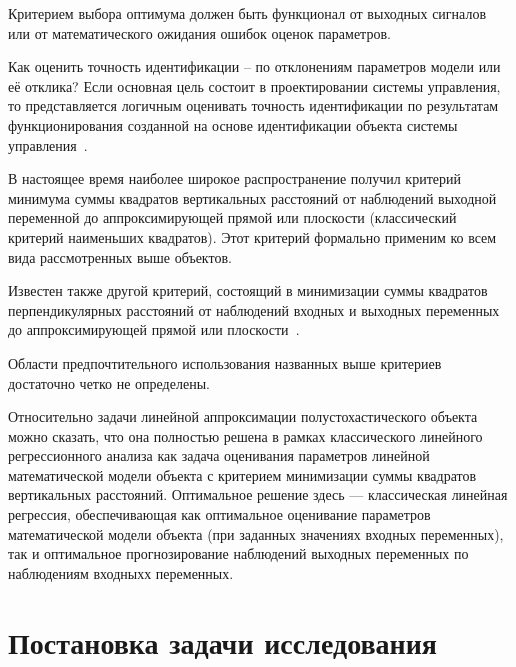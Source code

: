 Критерием выбора оптимума должен быть функционал от выходных
сигналов или от математического ожидания ошибок оценок параметров.

Как оценить точность идентификации -- по отклонениям параметров
модели или её отклика? Если основная цель состоит в
проектировании системы управления, то представляется логичным
оценивать точность идентификации по результатам функционирования
созданной на основе идентификации объекта системы управления~\cite{eikhoff_1975}.

В настоящее время наиболее широкое распространение получил критерий
минимума суммы квадратов вертикальных расстояний от наблюдений выходной переменной
до аппроксимирующей прямой или плоскости (классический критерий наименьших квадратов).
Этот критерий формально применим ко всем вида рассмотренных выше объектов.

Известен также другой критерий, состоящий в минимизации суммы квадратов
перпендикулярных расстояний от наблюдений входных и выходных переменных до
аппроксимирующей прямой или плоскости~\cite{pearson_1901, mukha_2016}.

Области предпочтительного использования названных выше критериев
достаточно четко не определены.

Относительно задачи линейной аппроксимации полустохастического объекта
можно сказать, что она полностью решена в рамках классического линейного
регрессионного анализа как задача оценивания параметров линейной математической модели
объекта с критерием минимизации суммы квадратов вертикальных расстояний.
Оптимальное решение здесь --- классическая линейная регрессия,
обеспечивающая как оптимальное оценивание параметров математической модели объекта
(при заданных значениях входных переменных),
так и оптимальное прогнозирование наблюдений выходных переменных
по наблюдениям входныхх переменных.

\section{Постановка задачи исследования}



